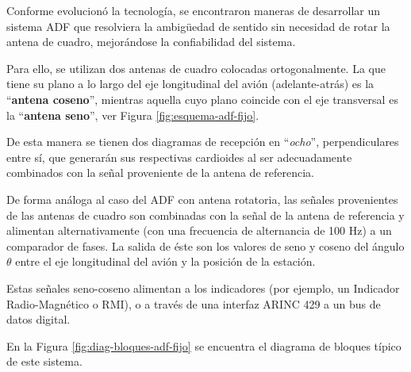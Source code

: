 Conforme evolucion\'o la tecnolog\'ia, se encontraron maneras de desarrollar un sistema ADF que resolviera la ambigüedad de sentido sin necesidad de rotar la antena de cuadro, mejor\'andose la confiabilidad del sistema.

Para ello, se utilizan dos antenas de cuadro colocadas ortogonalmente. La que tiene su plano a lo largo del eje longitudinal del avi\'on (adelante-atr\'as) es la ``\textbf{antena coseno}'', mientras aquella cuyo plano coincide con el eje transversal es la ``\textbf{antena seno}'', ver Figura \ref{fig:esquema-adf-fijo}.

De esta manera se tienen dos diagramas de recepci\'on en ``\emph{ocho}'', perpendiculares entre s\'i, que generar\'an sus respectivas cardioides al ser adecuadamente combinados con la se\~nal proveniente de la antena de referencia.%



De forma an\'aloga al caso del ADF con antena rotatoria, las se\~nales provenientes de las antenas de cuadro son combinadas con la se\~nal de la antena de referencia y alimentan alternativamente (con una frecuencia de alternancia de 100 Hz) a un comparador de fases. La salida de \'este son los valores de seno y coseno del \'angulo $\theta$ entre el eje longitudinal del avi\'on y la posici\'on de la estaci\'on.

Estas se\~nales seno-coseno alimentan a los indicadores (por ejemplo, un Indicador Radio-Magn\'etico o RMI), o a trav\'es de una interfaz ARINC 429 a un bus de datos digital.

En la Figura \ref{fig:diag-bloques-adf-fijo} se encuentra el diagrama de bloques t\'ipico de este sistema.

